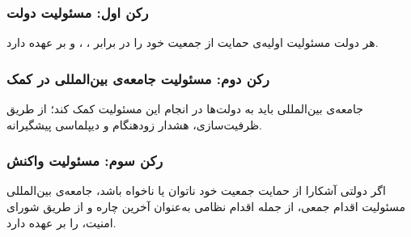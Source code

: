 \begin{tcolorbox}[legalbox,
	title={سه رکن دکترین مسئولیت حمایت}]
	
	\subsubsection{رکن اول: مسئولیت دولت}
	هر دولت مسئولیت اولیه‌ی حمایت از جمعیت خود را در برابر
	، ،  و  بر عهده
	دارد.
	
	\subsubsection{رکن دوم: مسئولیت جامعه‌ی بین‌المللی در کمک}
	جامعه‌ی بین‌المللی باید به دولت‌ها در انجام این مسئولیت کمک
	کند؛ از طریق ظرفیت‌سازی، هشدار زودهنگام و دیپلماسی
	پیشگیرانه.
	
	\subsubsection{رکن سوم: مسئولیت واکنش}
	اگر دولتی آشکارا از حمایت جمعیت خود ناتوان یا ناخواه باشد،
	جامعه‌ی بین‌المللی مسئولیت اقدام جمعی، از جمله اقدام نظامی
	به‌عنوان آخرین چاره و از طریق شورای امنیت، را بر عهده
	دارد.
\end{tcolorbox}

